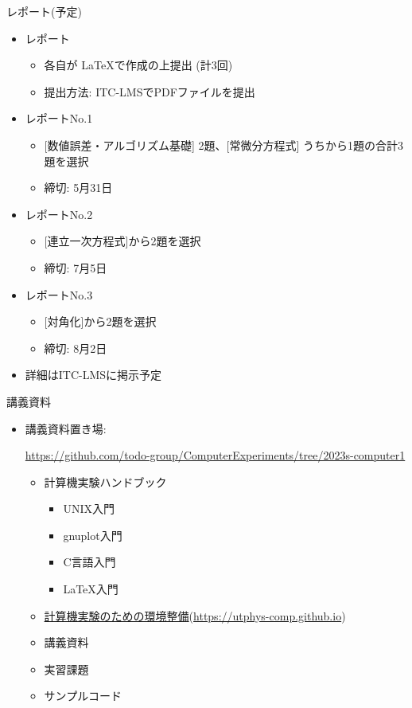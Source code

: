 \begin{frame}[t,fragile]{レポート(予定)}
  \begin{itemize}
  \item レポート
    \begin{itemize}
    \item 各自が \LaTeX で作成の上提出 (計3回)
    \item 提出方法: ITC-LMSでPDFファイルを提出
    \end{itemize}
  \item レポートNo.1
    \begin{itemize}
    \item \mbox{} [数値誤差・アルゴリズム基礎] 2題、[常微分方程式] うちから1題の合計3題を選択
    \item 締切: 5月31日
    \end{itemize}
  \item レポートNo.2
    \begin{itemize}
    \item \mbox{} [連立一次方程式]から2題を選択
    \item 締切: 7月5日
    \end{itemize}
  \item レポートNo.3
    \begin{itemize}
    \item \mbox{} [対角化]から2題を選択
    \item 締切: 8月2日
    \end{itemize}
  \item 詳細はITC-LMSに掲示予定
  \end{itemize}    
\end{frame}

\begin{frame}[t]{講義資料}
  \begin{itemize}
  \item 講義資料置き場:
  
    {\footnotesize \href{https://github.com/todo-group/ComputerExperiments/tree/2023s-computer1}{https://github.com/todo-group/ComputerExperiments/tree/2023s-computer1}}
    \begin{itemize}
    \item 計算機実験ハンドブック
      \begin{itemize}
      \item UNIX入門
      \item gnuplot入門
      \item C言語入門
      \item \LaTeX 入門
      \end{itemize}
    \item \href{https://utphys-comp.github.io}{計算機実験のための環境整備}({\small \href{https://utphys-comp.github.io}{https://utphys-comp.github.io}})
    \item 講義資料
    \item 実習課題
    \item サンプルコード
    \end{itemize}
  \end{itemize}
\end{frame}

